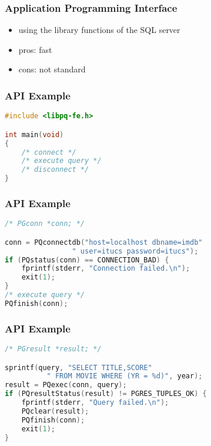 \documentclass[dvipsnames]{beamer}
\theoremstyle{plain}
\begin{document}
\begin{frame}
  \frametitle{Application Programming Interface}

  \begin{itemize}
    \item using the library functions of the SQL server

    \pause
    \bigskip
    \item pros: fast
    \item cons: not standard
  \end{itemize}
\end{frame}

\begin{frame}[fragile]
  \frametitle{API Example}

  \begin{example}[PostgreSQL - C]
    \begin{lstlisting}[language=C]
#include <libpq-fe.h>

int main(void)
{
    /* connect */
    /* execute query */
    /* disconnect */
}
    \end{lstlisting}
  \end{example}
\end{frame}

\begin{frame}[fragile]
  \frametitle{API Example}

  \begin{example}[connecting]
    \begin{lstlisting}[language=C]
/* PGconn *conn; */

conn = PQconnectdb("host=localhost dbname=imdb"
                " user=itucs password=itucs");
if (PQstatus(conn) == CONNECTION_BAD) {
    fprintf(stderr, "Connection failed.\n");
    exit(1);
}
/* execute query */
PQfinish(conn);
    \end{lstlisting}
  \end{example}
\end{frame}

\begin{frame}[fragile]
  \frametitle{API Example}

  \begin{example}
    \begin{lstlisting}[language=C]
/* PGresult *result; */

sprintf(query, "SELECT TITLE,SCORE"
          " FROM MOVIE WHERE (YR = %d)", year);
result = PQexec(conn, query);
if (PQresultStatus(result) != PGRES_TUPLES_OK) {
    fprintf(stderr, "Query failed.\n");
    PQclear(result);
    PQfinish(conn);
    exit(1);
}
    \end{lstlisting}
  \end{example}
\end{frame}
\end{document}
